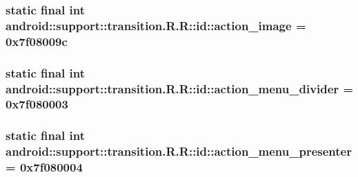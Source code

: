 \hypertarget{classandroid_1_1support_1_1transition_1_1_r_1_1id_f2264864ee269f5cad96c154d60fa676}{
\subsubsection[{action\_\-image}]{\setlength{\rightskip}{0pt plus 5cm}static final int android::support::transition.R.R::id::action\_\-image = 0x7f08009c}}
\label{classandroid_1_1support_1_1transition_1_1_r_1_1id_f2264864ee269f5cad96c154d60fa676}


\hypertarget{classandroid_1_1support_1_1transition_1_1_r_1_1id_e783e5f81f5faf6a2755622962cf0104}{
\subsubsection[{action\_\-menu\_\-divider}]{\setlength{\rightskip}{0pt plus 5cm}static final int android::support::transition.R.R::id::action\_\-menu\_\-divider = 0x7f080003}}
\label{classandroid_1_1support_1_1transition_1_1_r_1_1id_e783e5f81f5faf6a2755622962cf0104}


\hypertarget{classandroid_1_1support_1_1transition_1_1_r_1_1id_eedc622dd83fe0ebd5c988a9fdfde2ec}{
\subsubsection[{action\_\-menu\_\-presenter}]{\setlength{\rightskip}{0pt plus 5cm}static final int android::support::transition.R.R::id::action\_\-menu\_\-presenter = 0x7f080004}}
\label{classandroid_1_1support_1_1transition_1_1_r_1_1id_eedc622dd83fe0ebd5c988a9fdfde2ec}


